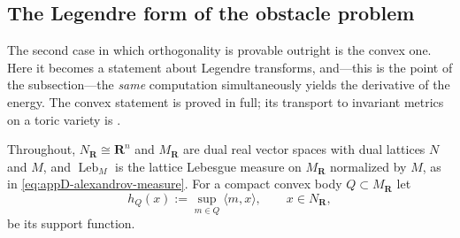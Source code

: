 \subsection{The Legendre form of the obstacle problem}
\label{sec:ch27-legendre}

The second case in which orthogonality is provable outright is the convex
one.  Here it becomes a statement about Legendre transforms, and---this is
the point of the subsection---the \emph{same} computation simultaneously
yields the derivative of the energy.  The convex statement is proved in
full; its transport to invariant metrics on a toric variety is
.

Throughout, $N_{\mathbf R}\cong\mathbf R^n$ and $M_{\mathbf R}$ are dual
real vector spaces with dual lattices $N$ and $M$, and
$\operatorname{Leb}_M$ is the lattice Lebesgue measure on
$M_{\mathbf R}$ normalized by $M$, as in
\eqref{eq:appD-alexandrov-measure}.  For a compact convex body
$Q\subset M_{\mathbf R}$ let
\[
 h_Q(x):=\sup_{m\in Q}\langle m,x\rangle,
 \qquad x\in N_{\mathbf R},
\]
be its support function.

